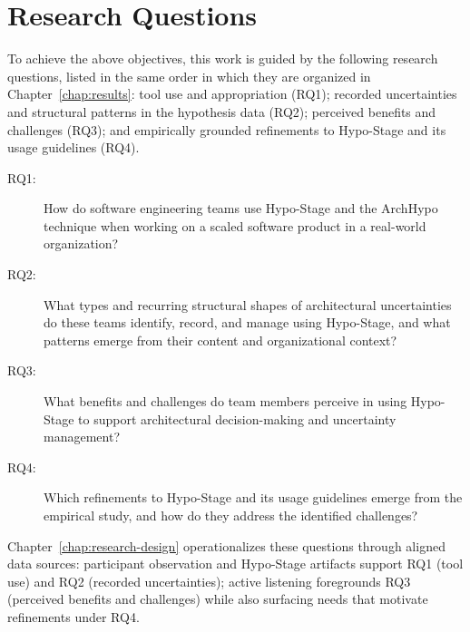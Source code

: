 \section{Research Questions}

To achieve the above objectives, this work is guided by the following research questions, listed in the same order in which they are organized in Chapter~\ref{chap:results}: tool use and appropriation (RQ1); recorded uncertainties and structural patterns in the hypothesis data (RQ2); perceived benefits and challenges (RQ3); and empirically grounded refinements to Hypo-Stage and its usage guidelines (RQ4).

\begin{description}
  \item[RQ1:] How do software engineering teams use Hypo-Stage and the ArchHypo technique when working on a scaled software product in a real-world organization?
  \item[RQ2:] What types and recurring structural shapes of architectural uncertainties do these teams identify, record, and manage using Hypo-Stage, and what patterns emerge from their content and organizational context?
  \item[RQ3:] What benefits and challenges do team members perceive in using Hypo-Stage to support architectural decision-making and uncertainty management?
  \item[RQ4:] Which refinements to Hypo-Stage and its usage guidelines emerge from the empirical study, and how do they address the identified challenges?
\end{description}

Chapter~\ref{chap:research-design} operationalizes these questions through aligned data sources: participant observation and Hypo-Stage artifacts support RQ1 (tool use) and RQ2 (recorded uncertainties); active listening foregrounds RQ3 (perceived benefits and challenges) while also surfacing needs that motivate refinements under RQ4.

